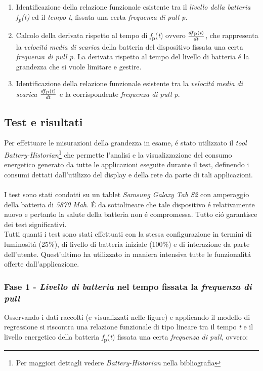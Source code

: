 \documentclass{article}
\begin{document}
\begin{enumerate}
\item{Identificazione della relazione funzionale esistente tra il \textit{livello della batteria \textit{f}\textsubscript{p}(\textit{t})} ed il \textit{tempo t}, fissata una certa \textit{frequenza di pull p}.}
\item{Calcolo della derivata rispetto al tempo di \textit{f}\textsubscript{p}(\textit{t}) ovvero \(\frac{df\textsubscript{p}(\textit{t})}{dt}\), che rappresenta la \textit{velocit\'a media di scarica} della batteria del dispositivo fissata una certa \textit{frequenza di pull p}. La derivata rispetto al tempo del livello di batteria \'e la grandezza che si vuole limitare e gestire.}
\item{Identificazione della relazione funzionale esistente tra la \textit{velocit\'a media di scarica \(\frac{df\textsubscript{p}(\textit{t})}{dt}\)} e la corrispondente \textit{frequenza di pull p}.}
\end{enumerate} 

\subsection{Test e risultati}

Per effettuare le misurazioni della grandezza in esame, \'e stato utilizzato il \textit{tool Battery-Historian}\footnote{Per maggiori dettagli vedere \textit{Battery-Historian} nella bibliografia} che permette l'analisi e la visualizzazione del consumo energetico generato da tutte le applicazioni eseguite durante il test, definendo i consumi dettati dall'utilizzo del display e della rete da parte di tali applicazioni.
\\\\
I test sono stati condotti su un tablet \textit{Samsung Galaxy Tab S2} con amperaggio della batteria di \textit{5870 Mah}. \'E da sottolineare che tale dispositivo \'e relativamente nuovo e pertanto la salute della batteria non \'e compromessa. Tutto ci\'o garantisce dei test significativi.
\\
Tutti quanti i test sono stati effettuati con la stessa configurazione in termini di luminosit\'a (25\%), di livello di batteria iniziale (100\%) e di interazione da parte dell'utente. Quest'ultimo ha utilizzato in maniera intensiva tutte le funzionalit\'a offerte dall'applicazione.

\subsubsection{Fase 1 - \textit{Livello di batteria} nel tempo fissata la \textit{frequenza di pull}}
Osservando i dati raccolti (e visualizzati nelle figure) e applicando il modello di regressione si riscontra una relazione funzionale di tipo lineare tra il tempo \textit{t} e il livello energetico della batteria \textit{f}\textsubscript{p}(\textit{t}) fissata una certa \textit{frequenza di pull}, ovvero:
\end{document}
